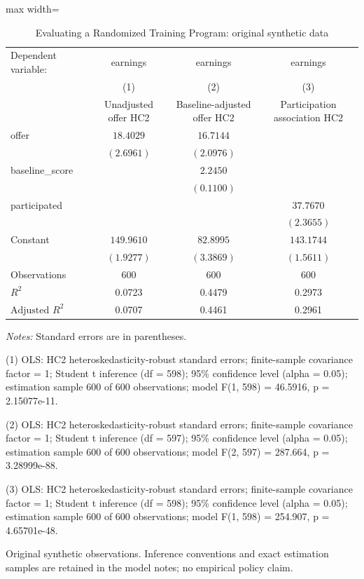 \begin{table}[htbp]
\centering
\caption{Evaluating a Randomized Training Program: original synthetic data}
\label{tab:14-randomized-program}
\begingroup
\small
\setlength{\tabcolsep}{6pt}
\renewcommand{\arraystretch}{1.12}
\begin{adjustbox}{max width=\linewidth}
\begin{tabular}{@{}lccc@{}}
\toprule
Dependent variable: & earnings & earnings & earnings \\
 & (1) & (2) & (3) \\
 & Unadjusted offer HC2 & Baseline-adjusted offer HC2 & Participation association HC2 \\
\midrule
offer & $18.4029$ & $16.7144$ &  \\
 & $(2.6961)$ & $(2.0976)$ &  \\[0.35em]
baseline\_score &  & $2.2450$ &  \\
 &  & $(0.1100)$ &  \\[0.35em]
participated &  &  & $37.7670$ \\
 &  &  & $(2.3655)$ \\[0.35em]
Constant & $149.9610$ & $82.8995$ & $143.1744$ \\
 & $(1.9277)$ & $(3.3869)$ & $(1.5611)$ \\[0.35em]
\midrule
Observations & 600 & 600 & 600 \\
$R^{2}$ & 0.0723 & 0.4479 & 0.2973 \\
$\text{Adjusted }R^{2}$ & 0.0707 & 0.4461 & 0.2961 \\
\bottomrule
\end{tabular}
\end{adjustbox}
\par\smallskip
\begin{minipage}{\linewidth}
\footnotesize
\raggedright
\textit{Notes:} Standard errors are in parentheses.\par
(1) OLS: HC2 heteroskedasticity-robust standard errors; finite-sample covariance factor = 1; Student t inference (df = 598); 95\% confidence level (alpha = 0.05); estimation sample 600 of 600 observations; model F(1, 598) = 46.5916, p = 2.15077e-11.\par
(2) OLS: HC2 heteroskedasticity-robust standard errors; finite-sample covariance factor = 1; Student t inference (df = 597); 95\% confidence level (alpha = 0.05); estimation sample 600 of 600 observations; model F(2, 597) = 287.664, p = 3.28999e-88.\par
(3) OLS: HC2 heteroskedasticity-robust standard errors; finite-sample covariance factor = 1; Student t inference (df = 598); 95\% confidence level (alpha = 0.05); estimation sample 600 of 600 observations; model F(1, 598) = 254.907, p = 4.65701e-48.\par
Original synthetic observations. Inference conventions and exact estimation samples are retained in the model notes; no empirical policy claim.\par
\end{minipage}
\endgroup
\end{table}
